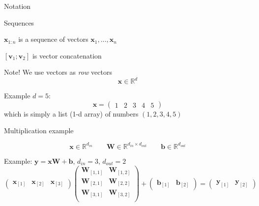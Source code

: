 \documentclass[12pt,aspectratio=169,handout]{beamer}
\begin{document}
\begin{frame}{Notation}
	
\begin{block}{Sequences}

$\bm{x}_{1:n}$ is a sequence of vectors $\bm{x}_1, \ldots, \bm{x}_n$

$[\bm{v}_1 ; \bm{v}_2]$ is vector concatenation
	
\end{block}
	
\begin{block}{Note! We use vectors as \emph{row} vectors}
$$
\bm{x} \in \mathbb{R}^{d}
$$
\end{block}

Example $d = 5$:
$$
\bm{x} = \begin{pmatrix}
1 & 2 & 3 & 4 & 5
\end{pmatrix}
$$
which is simply a list (1-d array) of numbers $(1, 2, 3, 4, 5)$

\end{frame}

\begin{frame}{Multiplication example}
	
$$
\bm{x} \in \mathbb{R}^{d_{in}} \qquad
\bm{W} \in \mathbb{R}^{d_{in} \times d_{out}} \qquad
\bm{b} \in \mathbb{R}^{d_{out}}
$$


\begin{block}{Example: $\bm{y} = \bm{x} \bm{W} + \bm{b}$, $d_{in} = 3$, $d_{out} = 2$}
	$$
	\begin{pmatrix}
		\bm{x}_{[1]} & \bm{x}_{[2]} & \bm{x}_{[3]}
	\end{pmatrix}
	\begin{pmatrix}
		\bm{W}_{[1,1]} & \bm{W}_{[1,2]} \\
		\bm{W}_{[2,1]} & \bm{W}_{[2,2]} \\
		\bm{W}_{[3,1]} & \bm{W}_{[3,2]} \\
	\end{pmatrix}
	+
	\begin{pmatrix}
		\bm{b}_{[1]} & \bm{b}_{[2]}
	\end{pmatrix}
	=
	\begin{pmatrix}
		\bm{y}_{[1]} & \bm{y}_{[2]}
	\end{pmatrix}
	$$
\end{block}
	
\end{frame}
\end{document}
